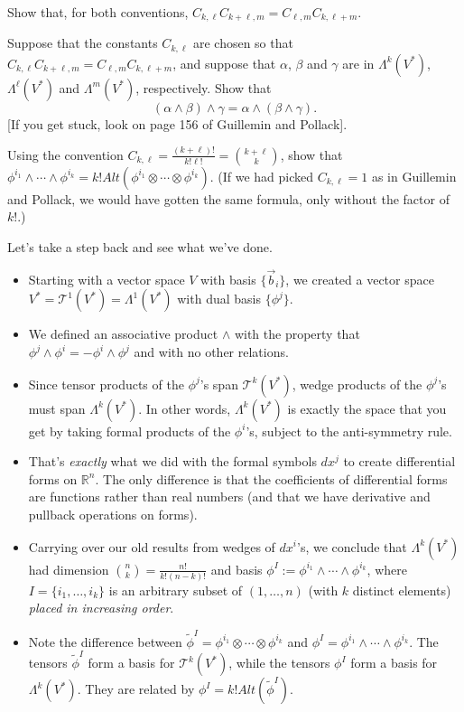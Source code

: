 \documentclass[12pt]{amsbook}
\newcommand{\T}{{\mathcal T}}
\newcommand{\R}{{\mathbb R}}
\theoremstyle{definition}
\begin{document}
 Show that, for both conventions, 
$C_{k,\ell} C_{k+\ell,m}= C_{\ell,m}C_{k,\ell+m}$. 

\smallskip

 Suppose that the constants $C_{k,\ell}$ are chosen
so that $C_{k,\ell} C_{k+\ell,m}= C_{\ell,m}C_{k,\ell+m}$, and suppose that 
$\alpha$, $\beta$ and $\gamma$ are in $\Lambda^k(V^*)$, $\Lambda^\ell(V^*)$ and 
$\Lambda^m(V^*)$, respectively. Show that 
$$(\alpha \wedge \beta) \wedge \gamma = \alpha \wedge (\beta \wedge \gamma).$$
[If you get stuck, look on page 156 of Guillemin and Pollack].

 Using the convention $C_{k,\ell} = 
\frac{(k+\ell)!}{k!\ell!} = { k+\ell \choose k}$, show that 
$\phi^{i_1}\wedge\cdots\wedge \phi^{i_k} = k! Alt(\phi^{i_1}\otimes \cdots
\otimes \phi^{i_k})$. (If we had picked $C_{k,\ell}=1$ as in 
Guillemin and Pollack, we would have gotten the same formula, only without
the factor of $k!$.)
 
\smallskip

Let's take a step back and see what we've done.
\begin{itemize}
\item Starting with a vector space $V$ with basis $\{\vec b_i\}$, we 
created a vector space $V^*=\T^1(V^*)=\Lambda^1(V^*)$ with dual basis 
$\{\phi^j\}$.
\item We defined an associative product $\wedge$ with the property that
$\phi^j \wedge \phi^i = - \phi^i \wedge \phi^j$ and with no other relations. 
\item Since tensor products of the $\phi^j$'s span $\T^k(V^*)$, wedge
products of the $\phi^j$'s must span $\Lambda^k(V^*)$. In other words,
$\Lambda^k(V^*)$ is exactly the space that you get by taking formal 
products of the $\phi^i$'s, subject to the anti-symmetry rule.
\item That's {\em exactly} what we did with the formal symbols $dx^j$ to
create differential forms on $\R^n$. The only difference is that the 
coefficients of differential forms are functions rather than real numbers
(and that we have derivative and pullback operations on forms).
\item Carrying over our old results from wedges of $dx^i$'s, we conclude that 
$\Lambda^k(V^*)$ had dimension ${n \choose k} = \frac{n!}{k!(n-k)!}$
and basis $\phi^I := \phi^{i_1}\wedge \cdots \wedge \phi^{i_k}$, where
$I=\{i_1,\ldots,i_k\}$ is an arbitrary subset of $(1,\ldots,n)$ (with $k$
distinct elements) {\em placed in increasing order}. 
\item Note the difference between $\tilde \phi^I = \phi^{i_1}\otimes
\cdots \otimes \phi^{i_k}$ and $\phi^I = \phi^{i_1}
\wedge \cdots \wedge \phi^{i_k}$. The tensors $\tilde \phi^I$ form a basis
for $\T^k(V^*)$, while the tensors $\phi^I$ form a basis for 
$\Lambda^k(V^*)$. They are related by $\phi^I = k! Alt(\tilde \phi^I)$. 
\end{itemize}
\end{document}
